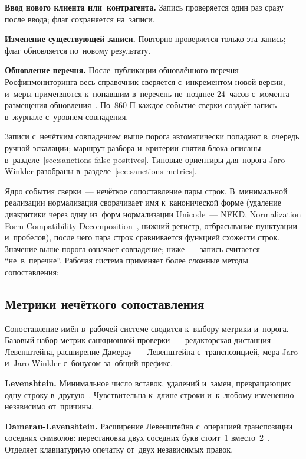 \textbf{Ввод нового клиента или~контрагента.} Запись проверяется один раз
сразу после ввода; флаг сохраняется на~записи.

\textbf{Изменение существующей записи.} Повторно проверяется только эта запись;
флаг обновляется по~новому результату.

\textbf{Обновление перечня.} После~публикации обновлённого перечня
Росфинмониторинга весь справочник сверяется с~инкрементом новой версии,
и~меры применяются к~попавшим в~перечень не~позднее 24~часов с~момента
размещения обновления~\cite{fz-115}. По~860-П
каждое событие сверки создаёт запись в~журнале с~уровнем совпадения.

Записи с~нечётким совпадением выше порога автоматически попадают в~очередь
ручной эскалации; маршрут разбора и~критерии снятия блока описаны
в~разделе~\ref{sec:sanctions-false-positives}. Типовые ориентиры для~порога
Jaro-Winkler разобраны в~разделе~\ref{sec:sanctions-metrics}.

Ядро события сверки~--- нечёткое сопоставление пары строк. В~минимальной
реализации нормализация сворачивает имя к~канонической форме (удаление
  диакритики через одну из~форм нормализации Unicode~--- NFKD, Normalization
  Form Compatibility Decomposition~\cite{unicode-uax15}, нижний регистр,
отбрасывание пунктуации и~пробелов), после чего пара строк сравнивается
функцией схожести строк. Значение выше порога означает совпадение; ниже~---
запись считается \enquote{не~в~перечне}. Рабочая система применяет более сложные
методы сопоставления:\nopagebreak%
\par\nobreak
{}

\subsection*{Метрики нечёткого сопоставления}\label{sec:sanctions-metrics}

Сопоставление имён в~рабочей системе сводится к~выбору метрики и~порога. Базовый
набор метрик санкционной проверки~---
редакторская дистанция Левенштейна, расширение Дамерау~--- Левенштейна
с~транспозицией, мера Jaro и~Jaro-Winkler с~бонусом за~общий префикс.

\textbf{Levenshtein.} Минимальное число вставок, удалений и~замен,
превращающих одну строку в~другую~\cite{levenshtein-1965}. Чувствительна
к~длине строки и~к~любому изменению независимо от~причины.

\textbf{Damerau-Levenshtein.} Расширение Левенштейна с~операцией транспозиции
соседних символов: перестановка двух соседних букв стоит~1
вместо~2~\cite{damerau-1964}. Отделяет клавиатурную опечатку от~двух
независимых правок.

